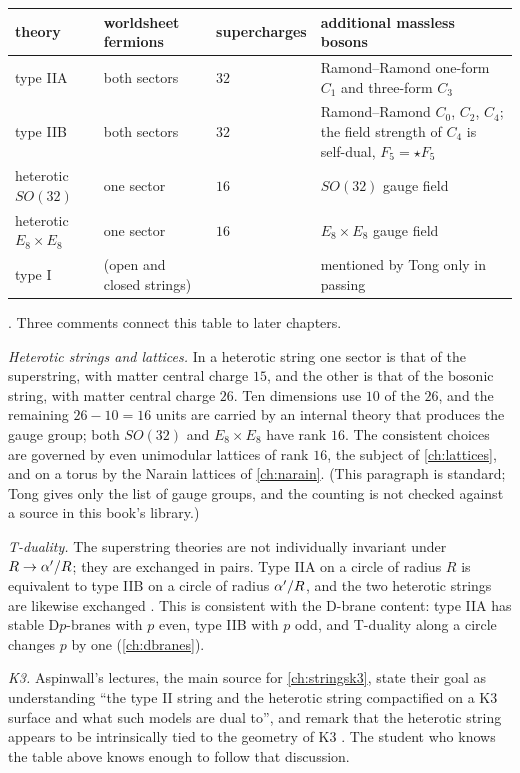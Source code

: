 \begin{center}
\renewcommand{\arraystretch}{1.2}
\begin{tabular}{@{}p{26mm}p{30mm}p{18mm}p{60mm}@{}}
\toprule
theory & worldsheet fermions & super\-charges & additional massless bosons\\
\midrule
type IIA & both sectors & $32$ & Ramond--Ramond one-form $C_1$ and three-form $C_3$\\
type IIB & both sectors & $32$ & Ramond--Ramond $C_0$, $C_2$, $C_4$; the field strength of
  $C_4$ is self-dual, $F_5=\star F_5$\\
heterotic $SO(32)$ & one sector & $16$ & $SO(32)$ gauge field\\
heterotic $E_8\times E_8$ & one sector & $16$ & $E_8\times E_8$ gauge field\\
type I & (open and closed strings) & & mentioned by Tong only in passing\\
\bottomrule
\end{tabular}
\end{center}
. Three comments connect this table to later chapters.

\emph{Heterotic strings and lattices.} In a heterotic string one sector is that of the
superstring, with matter central charge $15$, and the other is that of the bosonic string,
with matter central charge $26$. Ten dimensions use $10$ of the $26$, and the remaining
$26-10=16$ units are carried by an internal theory that produces the gauge group; both
$SO(32)$ and $E_8\times E_8$ have rank $16$. The consistent choices are governed by even
unimodular lattices of rank $16$, the subject of \cref{ch:lattices}, and on a torus by the
Narain lattices of \cref{ch:narain}. (This paragraph is standard; Tong gives only the list of
gauge groups, and the counting is not checked against a source in this book's library.)

\emph{T-duality.} The superstring theories are not individually invariant under
$R\to\alpha'/R$; they are exchanged in pairs. Type IIA on a circle of radius $R$ is equivalent to
type IIB on a circle of radius $\alpha'/R$, and the two heterotic strings are likewise exchanged
. This is consistent with the D-brane content: type IIA
has stable D$p$-branes with $p$ even, type IIB with $p$ odd, and T-duality along a circle
changes $p$ by one (\cref{ch:dbranes}).

\emph{K3.} Aspinwall's lectures, the main source for \cref{ch:stringsk3}, state their goal as
understanding ``the type II string and the heterotic string compactified on a K3 surface and
what such models are dual to'', and remark that the heterotic string appears to be
intrinsically tied to the geometry of K3 . The student who knows
the table above knows enough to follow that discussion.

